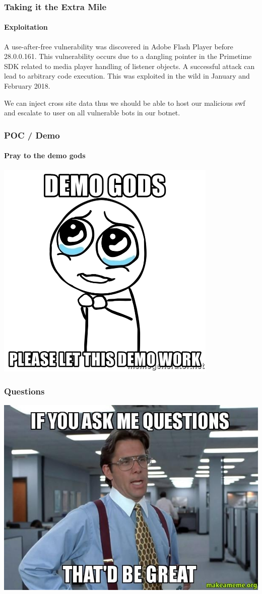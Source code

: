 \documentclass[aspectratio=169]{beamer}
\begin{document}
\begin{frame}
  \frametitle{Taking it the Extra Mile}
  \framesubtitle{Exploitation}
  \begin{center}
    \begin{tcolorbox}[title=CVE-2018-4878,colback=gray]
      A use-after-free vulnerability was discovered in Adobe Flash Player before 28.0.0.161. This vulnerability occurs due to a dangling pointer in the Primetime SDK related to media player handling of listener objects. A successful attack can lead to arbitrary code execution. This was exploited in the wild in January and February 2018. 
    \end{tcolorbox}
    \bigskip
    We can inject cross site data thus we should be able to host our malicious swf and escalate to user on all vulnerable bots in our botnet.
  \end{center}
\end{frame}
\begin{frame}
  \frametitle{POC / Demo}
  \framesubtitle{Pray to the demo gods}
  \begin{center}
    \includegraphics[scale=0.4]{demogods}
  \end{center}
\end{frame}
\begin{frame}
  \frametitle{Questions}
  \begin{center}
    \includegraphics[scale=0.3]{questions}
  \end{center}
\end{frame}
\end{document}
